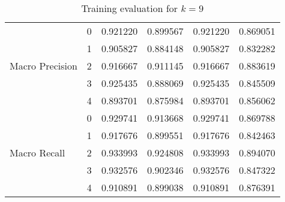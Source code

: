 \documentclass[twocolumn, a4paper, 8pt]{article}
\begin{document}
\begin{table}[h]
\begin{minipage}{0.45\textwidth}
{\begin{tabular}{llrrrr}
					\multirow[t]{5}{*}{Macro Precision} & 0 & 0.921220 & 0.899567 & 0.921220 & 0.869051 \\
					& 1 & 0.905827 & 0.884148 & 0.905827 & 0.832282 \\
					& 2 & 0.916667 & 0.911145 & 0.916667 & 0.883619 \\
					& 3 & 0.925435 & 0.888069 & 0.925435 & 0.845509 \\
					& 4 & 0.893701 & 0.875984 & 0.893701 & 0.856062 \\
					\cline{1-6}
					\toprule
					\multirow[t]{5}{*}{Macro Recall} & 0 & 0.929741 & 0.913668 & 0.929741 & 0.869788 \\
					& 1 & 0.917676 & 0.899551 & 0.917676 & 0.842463 \\
					& 2 & 0.933993 & 0.924808 & 0.933993 & 0.894070 \\
					& 3 & 0.932576 & 0.902346 & 0.932576 & 0.847322 \\
					& 4 & 0.910891 & 0.899038 & 0.910891 & 0.876391 \\
					\bottomrule
				\end{tabular}
			}
			\caption{Training evaluation for $k = 9$}
			\label{tab:k9table}
		\end{minipage}
		\hfill
		\begin{minipage}{0.45\textwidth}
			\vspace{0.5cm}
			\centering
\end{minipage}
\end{table}
\end{document}
